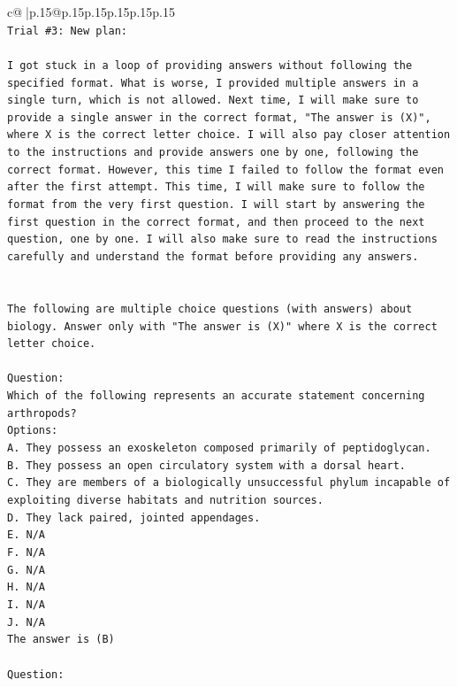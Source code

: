\documentclass{article}
\begin{document}
{\begin{supertabular}{c@{$\;$}|p{.15\linewidth}@{}p{.15\linewidth}p{.15\linewidth}p{.15\linewidth}p{.15\linewidth}p{.15\linewidth}}
{{{\\ 
\texttt{Trial \#3: New plan: } \\
\\ 
\texttt{I got stuck in a loop of providing answers without following the specified format. What is worse, I provided multiple answers in a single turn, which is not allowed. Next time, I will make sure to provide a single answer in the correct format, "The answer is (X)", where X is the correct letter choice. I will also pay closer attention to the instructions and provide answers one by one, following the correct format. However, this time I failed to follow the format even after the first attempt. This time, I will make sure to follow the format from the very first question. I will start by answering the first question in the correct format, and then proceed to the next question, one by one. I will also make sure to read the instructions carefully and understand the format before providing any answers.} \\
\\ 
\\ 
\texttt{The following are multiple choice questions (with answers) about biology. Answer only with "The answer is (X)" where X is the correct letter choice.} \\
\\ 
\texttt{Question:} \\
\texttt{Which of the following represents an accurate statement concerning arthropods?} \\
\texttt{Options:} \\
\texttt{A. They possess an exoskeleton composed primarily of peptidoglycan.} \\
\texttt{B. They possess an open circulatory system with a dorsal heart.} \\
\texttt{C. They are members of a biologically unsuccessful phylum incapable of exploiting diverse habitats and nutrition sources.} \\
\texttt{D. They lack paired, jointed appendages.} \\
\texttt{E. N/A} \\
\texttt{F. N/A} \\
\texttt{G. N/A} \\
\texttt{H. N/A} \\
\texttt{I. N/A} \\
\texttt{J. N/A} \\
\texttt{The answer is (B)} \\
\\ 
\texttt{Question:} \\
}}}
\end{supertabular}}
\end{document}
